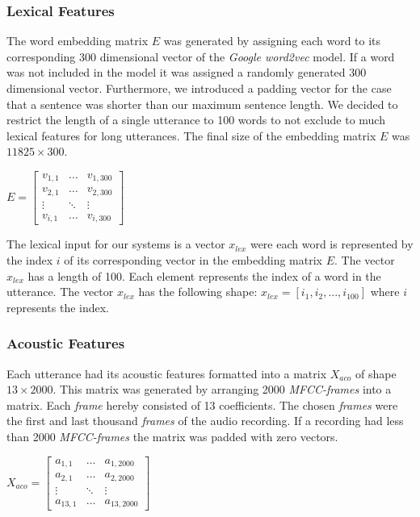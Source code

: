 \documentclass[11pt,a4paper]{article}
\begin{document}
	\subsubsection*{Lexical Features}
	\label{sec:lexicalFeatures}
	The word embedding matrix $E$ was generated by assigning each word to its corresponding 300 dimensional vector of the \textit{Google word2vec} model. If a word was not included in the model it was assigned a randomly generated 300 dimensional vector. Furthermore, we introduced a padding vector for the case that a sentence was shorter than our maximum sentence length. We decided to restrict the length of a single utterance to 100 words to not exclude to much lexical features for long utterances. The final size of the embedding matrix $E$ was $11825  \times 300$.
	\begin{center}
		$ E= 
		\begin{bmatrix}
		v_{1,1}	&  \dots	 & v_{1,300}    \\
		v_{2,1}	 	& \dots  & v_{2,300} 	\\
		\vdots	 	& \ddots & \vdots		\\
		v_{i,1} 	& \dots	 & v_{i,300}
		\end{bmatrix}
		$
	\end{center}
	\vspace{0.3cm}
	The lexical input for our systems is a vector $x_{lex}$ were each word is represented by the index $i$ of its corresponding vector in the embedding matrix $E$. The vector $x_{lex}$ has a length of 100. Each element represents the index of a word in the utterance. The vector $x_{lex}$ has the following shape: $x_{lex} = [i_{1}, i_{2}, ..., i_{100}]$ where $i$ represents the index.
	
	\subsubsection*{Acoustic Features}
	Each utterance had its acoustic features formatted into a matrix $X_{aco}$ of shape $13 \times 2000$. This matrix was generated by arranging 2000 \textit{MFCC-frames} into a matrix. Each \textit{frame} hereby consisted of 13 coefficients. The chosen \textit{frames} were the first and last thousand \textit{frames} of the audio recording. If a recording had less than 2000 \textit{MFCC-frames} the matrix was padded with zero vectors.
	
	\begin{center}
		$ X_{aco}= 
		\begin{bmatrix}
		a_{1,1}	&  \dots	 & a_{1,2000}   \\
		a_{2,1}	 	& \dots  & a_{2,2000} 	\\
		\vdots	 	& \ddots & \vdots		\\
		a_{13,1} 	& \dots	 & a_{13,2000}
		\end{bmatrix}
		$
	\end{center}
	\vspace{0.02cm}
	
\end{document}
